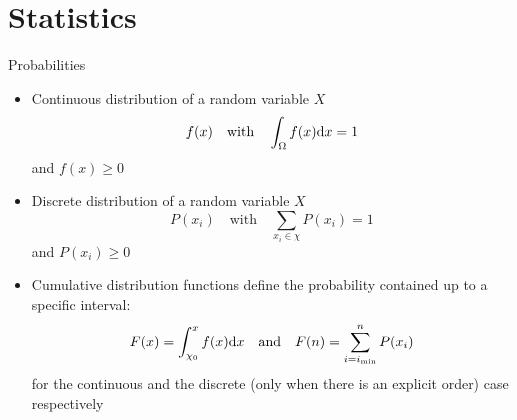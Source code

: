   \section{Statistics}
  \begin{frame}{Probabilities}
    \begin{itemize}
      \item Continuous distribution of a random variable $X$
        \begin{equation*}
          f(x) \quad\text{with}\quad \int_\Omega f(x) \mathrm{d}x = 1
        \end{equation*}
        and $f(x) \geq 0$
      \item Discrete distribution of a random variable $X$
        \begin{equation*}
          P(x_i) \quad\text{with}\quad \sum_{x_i\in\chi} P(x_i) = 1
        \end{equation*}
        and $P(x_i) \geq 0$
      \item Cumulative distribution functions define the probability contained up to a specific interval:
      \begin{equation*}
        F(x) = \int_{\chi_0}^x f(x) \mathrm{d}x
        \quad \text{and} \quad
        F(n) = \sum_{i=i_\text{min}}^n P(x_i)
      \end{equation*}
      for the continuous and the discrete (only when there is an explicit order) case respectively
    \end{itemize}
  \end{frame}

